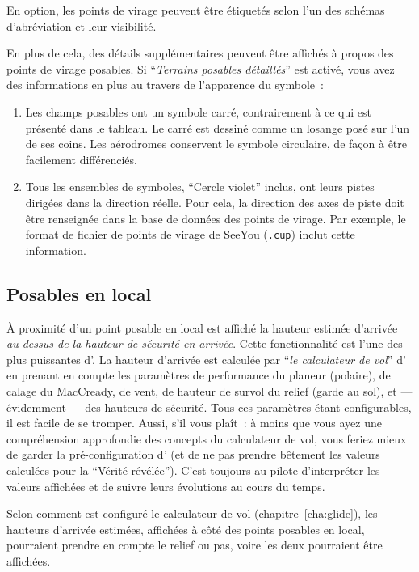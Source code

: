 En option, les points de virage peuvent être étiquetés selon l'un des
schémas d'abréviation  et leur visibilité.

En plus de cela, des détails supplémentaires peuvent être affichés à propos des points de virage posables.
Si
``\emph{Terrains posables détaillés}''
est activé, vous avez des informations en plus au travers de l'apparence du symbole~:
\begin{enumerate}
\item Les champs posables ont un symbole carré, contrairement à ce qui est présenté dans le tableau.
Le carré est dessiné comme un losange posé sur l'un de ses coins.
Les aérodromes conservent le symbole circulaire, de façon à être facilement différenciés.
\item Tous les ensembles de symboles, ``Cercle violet'' inclus, ont leurs pistes dirigées dans la direction réelle. Pour cela, la direction des axes de piste doit être renseignée dans la base de données des points de virage. Par exemple, le format de fichier de 
points de virage de SeeYou (\verb|.cup|) inclut cette information.
\end{enumerate}

\subsection*{Posables en local}
À proximité d'un point posable en local est affiché la hauteur
estimée d'arrivée \emph{au-dessus de la hauteur de sécurité en arrivée}.
Cette fonctionnalité est l'une des plus puissantes d'\xc.
La hauteur d'arrivée est calculée par ``\emph{le calculateur de vol}''
d'\xc{} en prenant en compte les paramètres de performance du planeur (polaire),
de calage du MacCready, de vent, de hauteur de survol
du relief (garde au sol), et --- évidemment --- des hauteurs de sécurité.
Tous ces paramètres étant configurables, il est facile de se tromper.
Aussi, s'il vous plaît~: à moins que vous ayez une compréhension approfondie des concepts du calculateur de vol, vous
\warning
feriez mieux de garder la pré-configuration d'\xc{} (et de ne pas prendre bêtement les valeurs calculées pour la ``Vérité révélée'').
C'est toujours au pilote d'interpréter les valeurs affichées et de suivre leurs évolutions au cours du temps.

Selon comment est configuré le calculateur de vol (chapitre~\ref{cha:glide}),
les hauteurs d'arrivée estimées, 
affichées à côté des points posables en local, pourraient prendre en compte le relief ou pas,
voire les deux pourraient être affichées.

